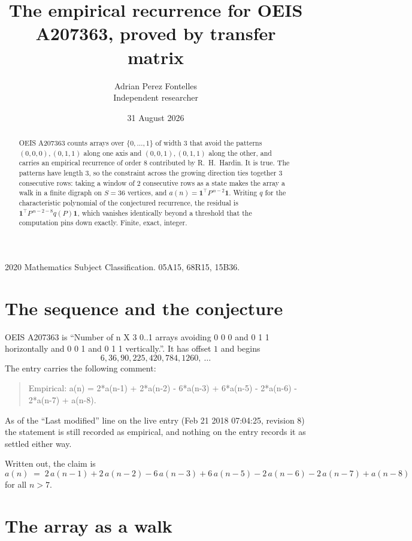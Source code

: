\documentclass[11pt,a4paper]{article}
\title{The empirical recurrence for OEIS A207363, proved by transfer matrix}
\author{Adrian Perez Fontelles\\ \small Independent researcher}
\date{31 August 2026}
\theoremstyle{plain}
\theoremstyle{definition}
\begin{document}
\maketitle

\begin{abstract}
OEIS A207363 counts arrays over $\{0,\dots,1\}$ of width $3$ that avoid the patterns
$(0,0,0), (0,1,1)$ along one axis and $(0,0,1), (0,1,1)$ along the other, and carries an empirical recurrence of
order $8$ contributed by R.~H.~Hardin. It is true. The patterns have length $3$, so
the constraint across the growing direction ties together $3$ consecutive rows: taking a
window of $2$ consecutive rows as a state makes the array a walk in a finite digraph
on $S=36$ vertices, and $a(n)=\mathbf{1}^{\!\top}P^{\,n-2}\mathbf{1}$. Writing $q$
for the characteristic polynomial of the conjectured recurrence, the residual is
$\mathbf{1}^{\!\top}P^{\,n-2-8}q(P)\mathbf{1}$, which vanishes identically
beyond a threshold that the computation pins down exactly. Finite, exact, integer.
\end{abstract}

\noindent\small 2020 Mathematics Subject Classification. 05A15, 68R15, 15B36.\normalsize

\section{The sequence and the conjecture}

OEIS A207363 is ``Number of n X 3 0..1 arrays avoiding 0 0 0 and 0 1 1 horizontally and 0 0 1 and 0 1 1 vertically.''. It has offset
$1$ and begins
\[
6, 36, 90, 225, 420, 784, 1260,\ \dots
\]
The entry carries the following comment:
\begin{quote}\small
Empirical: a(n) = 2*a(n-1) + 2*a(n-2) - 6*a(n-3) + 6*a(n-5) - 2*a(n-6) - 2*a(n-7) + a(n-8).
\end{quote}
As of the ``Last modified'' line on the live entry (Feb 21 2018 07:04:25, revision
8) the statement is still recorded as empirical, and nothing on the entry
records it as settled either way.

Written out, the claim is
\begin{equation}\label{eq:conj}
a(n)\;=\;2\,a(n-1) + 2\,a(n-2) - 6\,a(n-3) + 6\,a(n-5) - 2\,a(n-6) - 2\,a(n-7) + a(n-8)
\end{equation}
for all $n>7$. 

\section{The array as a walk}
\end{document}

